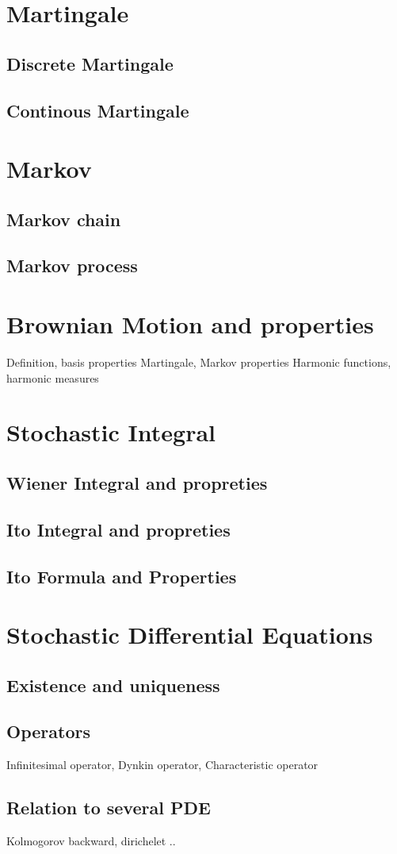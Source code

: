 \documentclass[a4paper,10pt]{article}
\begin{document}
\begin{center}\end{center}
\section{Martingale}
\subsection{Discrete Martingale}
\subsection{Continous Martingale}
\section{Markov}
\subsection{Markov chain}
\subsection{Markov process}
\section{Brownian Motion and properties}
Definition, basis properties
Martingale, Markov properties
Harmonic functions, harmonic measures
\section{Stochastic Integral}
\subsection{Wiener Integral and propreties}
\subsection{Ito Integral and propreties}
\subsection{Ito Formula and Properties}
\section{Stochastic Differential Equations}
\subsection{Existence and uniqueness}
\subsection{Operators}
Infinitesimal operator, Dynkin operator, Characteristic operator
\subsection{Relation to several PDE}
Kolmogorov backward, dirichelet ..
%
%
\end{document}
